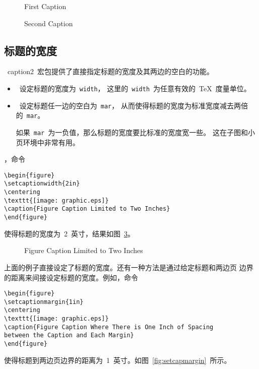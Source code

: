 \begin{figure} 
	\onelinecaptionstrue 
	\centering 
	\resizebox{2.5in}{!}{\usebox{\graphic}}
	\caption{First Caption}\label{fig:centertrue}
\end{figure}

\begin{figure} 
	\onelinecaptionsfalse
	\centering 
	\resizebox{2.5in}{!}{\usebox{\graphic}}
	\caption{Second Caption}\label{fig:centerfalse}
\end{figure}

\subsection{标题的宽度}

~\textsf{caption2}~宏包提供了直接指定标题的宽度及其两边的空白的功能。
\begin{itemize}
	\item {}~设定标题的宽度为~\texttt{width}，
	这里的~\texttt{width}~为任意有效的~\TeX{}~度量单位。
	\item {}~设定标题任一边的空白为~\texttt{mar}，
	从而使得标题的宽度为标准宽度减去两倍的~\texttt{mar}。
	
	如果~\texttt{mar}~为一负值，那么标题的宽度要比标准的宽度宽一些。
	这在子图和小页环境中非常有用。
\end{itemize}

，命令
\begin{Verbatim}[xleftmargin=1cm]
\begin{figure} 
\setcaptionwidth{2in} 
\centering 
\texttt{[image: graphic.eps]} 
\caption{Figure Caption Limited to Two Inches} 
\end{figure}
\end{Verbatim}
使得标题的宽度为~2~英寸，结果如图~\ref{fig:twoinwidth}。

\begin{figure} 
	\setcaptionwidth{2in}
	\centering 
	\resizebox{2in}{!}{\usebox{\graphic}}
	\caption{Figure Caption Limited to Two Inches}\label{fig:twoinwidth}
\end{figure}

上面的例子直接设定了标题的宽度。还有一种方法是通过给定标题和两边页
边界的距离来间接设定标题的宽度。例如，命令
\begin{Verbatim}[xleftmargin=1cm]
\begin{figure}
\setcaptionmargin{1in} 
\centering
\texttt{[image: graphic.eps]}
\caption{Figure Caption Where There is One Inch of Spacing 
between the Caption and Each Margin} 
\end{figure}
\end{Verbatim}
使得标题到两边页边界的距离为~1~英寸。如图~\ref{fig:setcapmargin}~所示。

